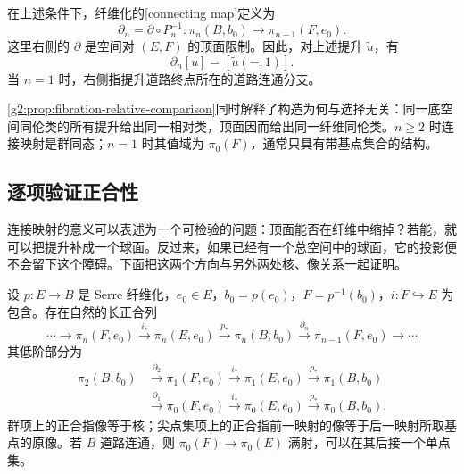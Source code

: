 \begin{definition}
	\label{g2:def:fibration-connecting-map}
	在上述条件下，纤维化的[connecting map]定义为
	\[
		\partial_n=\partial\circ P_n^{-1}:\pi_n(B,b_0)\longrightarrow\pi_{n-1}(F,e_0).
	\]
	这里右侧的 \(\partial\) 是空间对 \((E,F)\) 的顶面限制。因此，对上述提升 \(\widetilde u\)，有
	\[
		\partial_n[u]=[\widetilde u(-,1)].
	\]
	当 \(n=1\) 时，右侧指提升道路终点所在的道路连通分支。
\end{definition}

\cref{g2:prop:fibration-relative-comparison}同时解释了构造为何与选择无关：同一底空间同伦类的所有提升给出同一相对类，顶面因而给出同一纤维同伦类。\(n\ge2\) 时连接映射是群同态；\(n=1\) 时其值域为 \(\pi_0(F)\)，通常只具有带基点集合的结构。

\subsection{逐项验证正合性}
\label{g2:subsec:0803:02}

连接映射的意义可以表述为一个可检验的问题：顶面能否在纤维中缩掉？若能，就可以把提升补成一个球面。反过来，如果已经有一个总空间中的球面，它的投影便不会留下这个障碍。下面把这两个方向与另外两处核、像关系一起证明。

\begin{theorem}
	\label{g2:thm:fibration-homotopy-sequence}
	设 \(p:E\to B\) 是 Serre 纤维化，\(e_0\in E\)，\(b_0=p(e_0)\)，\(F=p^{-1}(b_0)\)，\(i:F\hookrightarrow E\) 为包含。存在自然的长正合列
	\[
		\cdots\longrightarrow\pi_n(F,e_0)\xrightarrow{i_*}\pi_n(E,e_0)
		\xrightarrow{p_*}\pi_n(B,b_0)\xrightarrow{\partial_n}\pi_{n-1}(F,e_0)
		\longrightarrow\cdots
	\]
	其低阶部分为
	\[
		\begin{aligned}
			\pi_2(B,b_0)&\xrightarrow{\partial_2}\pi_1(F,e_0)
			\xrightarrow{i_*}\pi_1(E,e_0)\xrightarrow{p_*}\pi_1(B,b_0)\\
			&\xrightarrow{\partial_1}\pi_0(F,e_0)\xrightarrow{i_*}\pi_0(E,e_0)
			\xrightarrow{p_*}\pi_0(B,b_0).
		\end{aligned}
	\]
	群项上的正合指像等于核；尖点集项上的正合指前一映射的像等于后一映射所取基点的原像。若 \(B\) 道路连通，则 \(\pi_0(F)\to\pi_0(E)\) 满射，可以在其后接一个单点集。
\end{theorem}

